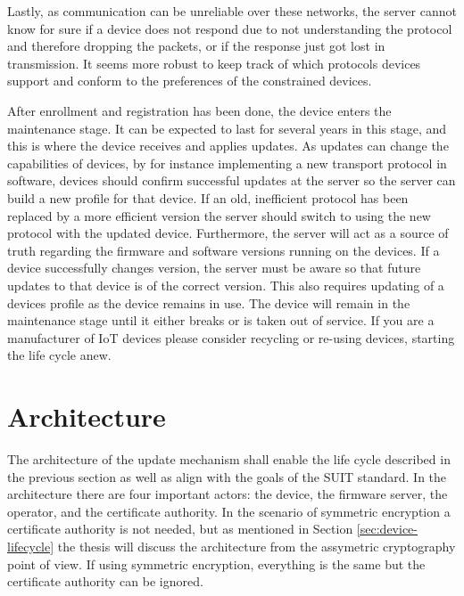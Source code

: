\documentclass[0-thesis.tex]{subfiles}
\begin{document}
Lastly, as communication can be unreliable over these networks, the server cannot know for
sure if a device does not respond due to not understanding the protocol and therefore
dropping the packets, or if the response just got lost in transmission. It seems more
robust to keep track of which protocols devices support and conform to the preferences of
the constrained devices.

After enrollment and registration has been done, the device enters the maintenance stage.
It can be expected to last for several years in this stage, and this is where the device
receives and applies updates. As updates can change the capabilities of devices, by for
instance implementing a new transport protocol in software, devices should confirm
successful updates at the server so the server can build a new profile for that device. If
an old, inefficient protocol has been replaced by a more efficient version the server
should switch to using the new protocol with the updated device. Furthermore, the server
will act as a source of truth regarding the firmware and software versions running on the
devices. If a device successfully changes version, the server must be aware so that future
updates to that device is of the correct version. This also requires updating of a devices
profile as the device remains in use. The device will remain in the maintenance stage
until it either breaks or is taken out of service. If you are a manufacturer of IoT
devices please consider recycling or re-using devices, starting the life cycle anew.

\section{Architecture}
\label{sec:architecture}
The architecture of the update mechanism shall enable the life cycle described in the
previous section as well as align with the goals of the SUIT standard. In the architecture
there are four important actors: the device, the firmware server, the operator, and the
certificate authority. In the scenario of symmetric encryption a certificate authority is
not needed, but as mentioned in Section \ref{sec:device-lifecycle} the thesis will discuss
the architecture from the assymetric cryptography point of view. If using symmetric
encryption, everything is the same but the certificate authority can be ignored.
\end{document}

